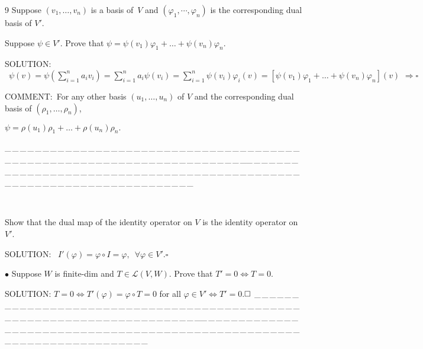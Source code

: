 \documentclass[a4paper, 11pt, UTF8]{article}
\def\Lm{\mathcal{L}}
\begin{document}
\begin{large}
{\timesbf\Large 9} {\timessl\Large
Suppose $(v_{1},\dots,v_{n})$ is a basis of \,$V$ and $(\varphi_{1},\cdots,\varphi_{n})$ is the corresponding dual basis of $V'$.}\par\quad
{\timessl \Large
Suppose $\psi \in V'$. Prove that $\psi=\psi(v_1)\varphi_1+\dots+\psi(v_n)\varphi_n.$
}\par
{\timesbf S\footnotesize{OLUTION:}} $\,\,\,\psi(v)=\psi(\sum\limits_{i=1}^n a_i v_i)=\sum\limits_{i=1}^n a_i\psi(v_i)=\sum\limits_{i=1}^n\psi(v_{i})\varphi_i(v)=[\psi(v_1)\varphi_1+\dots+\psi(v_n)\varphi_n](v) \,\,\Rightarrow \square$\par
C{\small OMMENT}:\,\,\,For any other basis $(u_1,\dots,u_n)$ of $V$ and the corresponding dual basis of $(\rho_1,\dots,\rho_n)$,\par\qquad\qquad\quad
$\psi=\rho(u_1)\rho_1+\dots+\rho(u_n)\rho_n.$\par
{\tiny \_\,\_\,\_\,\_\,\_\,\_\,\_\,\_\,\_\,\_\,\_\,\_\,\_\,\_\,\_\,\_\,\_\,\_\,\_\,\_\,\_\,\_\,\_\,\_\,\_\,\_\,\_\,\_\,\_\,\_\,\_\,\_\,\_\,\_\,\_\,\_\,\_\,\_\,\_\,\_\,\_\,\_\,\_\,\_\,\_\,\_\,\_\,\_\,\_\,\_\,\_\,\_\,\_\,\_\,\_\,\_\,\_\,\_\,\_\,\_\,\_\,\_\,\_\,\_\,\_\,\_\,\_\,\_\,\_\,\_\,\_\_\,\_\,\_\,\_\,\_\,\_\,\_\,\_\,\_\,\_\,\_\,\_\,\_\,\_\,\_\,\_\,\_\,\_\,\_\,\_\,\_\,\_\,\_\,\_\,\_\,\_\,\_\,\_\,\_\,\_\,\_\,\_\,\_\,\_\,\_\,\_\,\_\,\_\,\_\,\_\,\_\,\_\,\_\,\_\,\_\,\_\,\_\,\_\,\_\,\_\,\_\,\_\,\_\,\_\,\_\,\_\,\_\,\_\,\_\,\_\,\_\,\_\,\_\,\_\,\_\,\_\,\_\,\_\,\_\,\_\,\_}{\tiny\,\par}

{\Large{}} {\timessl\Large Show that the dual map of the identity operator on $V$ is the identity operator on $V'$.
}\par
{\timesbf S\footnotesize{OLUTION:}} \,\,\,$I'(\varphi)=\varphi\circ I=\varphi,\,\,\,\forall \varphi \in V'.$\qquad$\square$\par
{\small $\bullet$} {\timessl\Large
Suppose $W$ is finite-dim and $T \in \Lm(V, W)$. Prove that $T'=0 \Longleftrightarrow T=0.$
}\par
{\timesbf S\footnotesize{OLUTION:}} $T=0\Leftrightarrow T'(\varphi)=\varphi\circ T=0$ for all $\varphi\in V'\Leftrightarrow T'=0$.\quad$\square \\ $
{\tiny \_\,\_\,\_\,\_\,\_\,\_\,\_\,\_\,\_\,\_\,\_\,\_\,\_\,\_\,\_\,\_\,\_\,\_\,\_\,\_\,\_\,\_\,\_\,\_\,\_\,\_\,\_\,\_\,\_\,\_\,\_\,\_\,\_\,\_\,\_\,\_\,\_\,\_\,\_\,\_\,\_\,\_\,\_\,\_\,\_\,\_\,\_\,\_\,\_\,\_\,\_\,\_\,\_\,\_\,\_\,\_\,\_\,\_\,\_\,\_\,\_\,\_\,\_\,\_\,\_\,\_\,\_\,\_\,\_\,\_\,\_\_\,\_\,\_\,\_\,\_\,\_\,\_\,\_\,\_\,\_\,\_\,\_\,\_\,\_\,\_\,\_\,\_\,\_\,\_\,\_\,\_\,\_\,\_\,\_\,\_\,\_\,\_\,\_\,\_\,\_\,\_\,\_\,\_\,\_\,\_\,\_\,\_\,\_\,\_\,\_\,\_\,\_\,\_\,\_\,\_\,\_\,\_\,\_\,\_\,\_\,\_\,\_\,\_\,\_\,\_\,\_\,\_\,\_\,\_\,\_\,\_\,\_\,\_\,\_\,\_\,\_\,\_\,\_\,\_\,\_\,\_}\par


\end{large}
\end{document}
